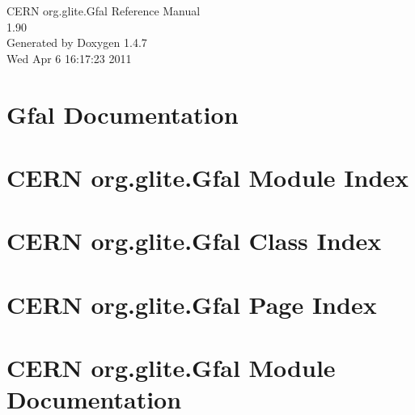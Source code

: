 \documentclass[a4paper]{book}
\begin{document}
\begin{titlepage}
\vspace*{7cm}
\begin{center}
{\Large CERN org.glite.Gfal Reference Manual\\[1ex]\large 1.90 }\\
\vspace*{1cm}
{\large Generated by Doxygen 1.4.7}\\
\vspace*{0.5cm}
{\small Wed Apr 6 16:17:23 2011}\\
\end{center}
\end{titlepage}
\clearemptydoublepage
{}
\tableofcontents
\clearemptydoublepage
{}
\chapter{Gfal Documentation }
\label{index}
\chapter{CERN org.glite.Gfal Module Index}

\chapter{CERN org.glite.Gfal Class Index}

\chapter{CERN org.glite.Gfal Page Index}

\chapter{CERN org.glite.Gfal Module Documentation}







\end{document}
